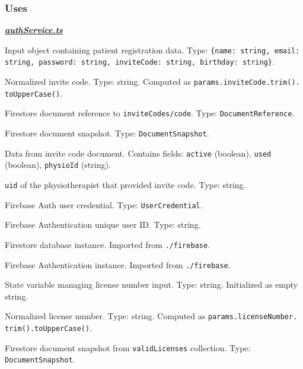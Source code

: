 \documentclass[12pt, titlepage]{article}
\begin{document}
\subsubsection{Uses}
\noindent \underline{\textbf{\textit{authService.ts}}} \\
\begin{description}[style=nextline, leftmargin=4cm]

\item[\texttt{params}] 
    Input object containing patient registration data. Type: \texttt{\{name: string, email: string, password: string, inviteCode: string, birthday: string\}}.

\item[\texttt{code}] 
    Normalized invite code. Type: string. Computed as \texttt{params.inviteCode.trim().\\toUpperCase()}.

\item[\texttt{inviteRef}] 
    Firestore document reference to \texttt{inviteCodes/code}. Type: \texttt{DocumentReference}.

\item[\texttt{inviteSnap}] 
    Firestore document snapshot. Type: \texttt{DocumentSnapshot}.

\item[\texttt{invite}] 
    Data from invite code document. Contains fields: \texttt{active} (boolean), \texttt{used} (boolean), \texttt{physioId} (string).

\item[\texttt{physioId}] 
    \texttt{uid} of the physiotherapist that provided invite code. Type: string.

\item[\texttt{cred}] 
    Firebase Auth user credential. Type: \texttt{UserCredential}.

\item[\texttt{uid}] 
    Firebase Authentication unique user ID. Type: string.

\item[\texttt{db}] 
    Firestore database instance. Imported from \texttt{./firebase}.

\item[\texttt{auth}] 
    Firebase Authentication instance. Imported from \texttt{./firebase}.

\item[\texttt{licenseNumber}] 
    State variable managing license number input. Type: string. Initialized as empty string.

\item[\texttt{lic}] 
    Normalized license number. Type: string. Computed as \texttt{params.licenseNumber.\\trim().toUpperCase()}.

\item[\texttt{licSnap}] 
    Firestore document snapshot from \texttt{validLicenses} collection. Type: \texttt{DocumentSnapshot}.

\end{description}
\end{document}
